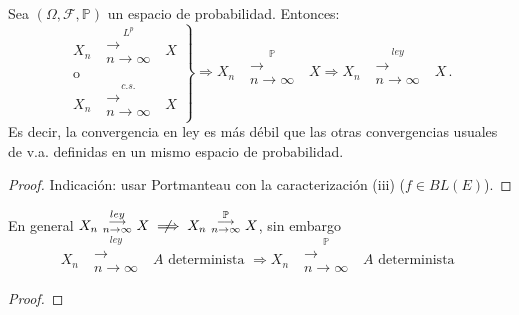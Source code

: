 \begin{proposition}
Sea $(\Omega,\mathcal{F},\mathbb{P})$ un espacio de probabilidad. Entonces:
$$\left.\begin{aligned}
X_n\mbox{ }\overset{L^p}{\substack{\longrightarrow \\n \to \infty}}\mbox{ }X \\ \mbox{o} \hspace{1cm} \\
X_n\mbox{ }\overset{c.s.}{\substack{\longrightarrow \\n \to \infty}}\mbox{ }X
\end{aligned}\right\} \Longrightarrow X_n\mbox{ }\overset{\mathbb{P}}{\substack{\longrightarrow \\n \to \infty}}\mbox{ }X \Longrightarrow X_n\mbox{ }\overset{ley}{\substack{\longrightarrow \\n \to \infty}}\mbox{ }X \, .$$
Es decir, la convergencia en ley es más débil que las otras convergencias usuales de v.a. definidas en un mismo espacio de probabilidad.
\end{proposition}
\begin{proof}
\ejercicio \gris

Indicación: usar Portmanteau con la caracterización (iii) ($f\in BL(E)$). \negro
\end{proof}

\begin{remark}
En general $X_n\mbox{ }\overset{ley}{\substack{\longrightarrow \\n \to \infty}}\mbox{ }X \centernot\implies X_n\mbox{ }\overset{\mathbb{P}}{\substack{\longrightarrow \\n \to \infty}}\mbox{ }X$, sin embargo
$$ X_n\mbox{ }\overset{ley}{\substack{\longrightarrow \\n \to \infty}}\mbox{ }A \mbox{ determinista } \Longrightarrow X_n\mbox{ }\overset{\mathbb{P}}{\substack{\longrightarrow \\n \to \infty}}\mbox{ }A \mbox{ determinista }$$
\end{remark}
\begin{proof}
\ejercicio
\end{proof}

